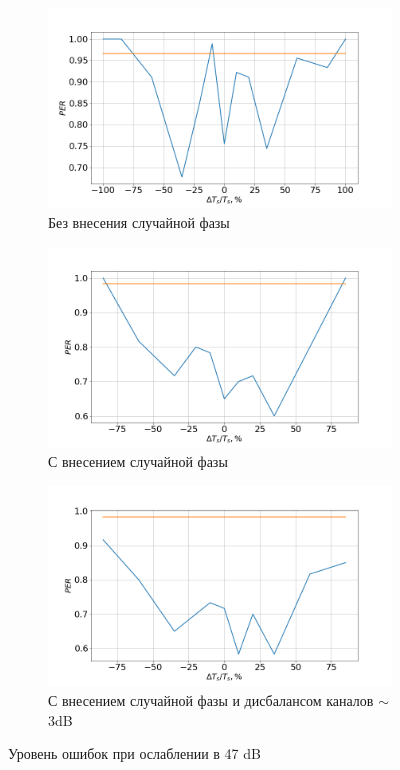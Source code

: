 \documentclass[a4paper,12pt,oneside, abstract=true]{scrartcl}
\begin{document}
\begin{figure}[!h]
	\centering
	\begin{subfigure}[h]{0.7\linewidth}
		\includegraphics[width=\textwidth]{pics/Timing4711.png}
		\caption{Без внесения случайной фазы}
		\label{fig:Timing47no}
	\end{subfigure}
	\begin{subfigure}[h]{0.7\linewidth}
		\includegraphics[width=\textwidth]{pics/Timing4721.png}
		\caption{С внесением случайной фазы}
		\label{fig:Timing47yes}
	\end{subfigure}
	\begin{subfigure}[h]{0.7\linewidth}
		\includegraphics[width=\textwidth]{pics/Timing4731.png}
		\caption{С внесением случайной фазы и дисбалансом каналов $\sim$ 3dB}
		\label{fig:Timing47disb}
	\end{subfigure}
	\caption{Уровень ошибок при ослаблении в 47 dB}
	\label{fig:Timing47}
\end{figure}
\FloatBarrier
\end{document}
